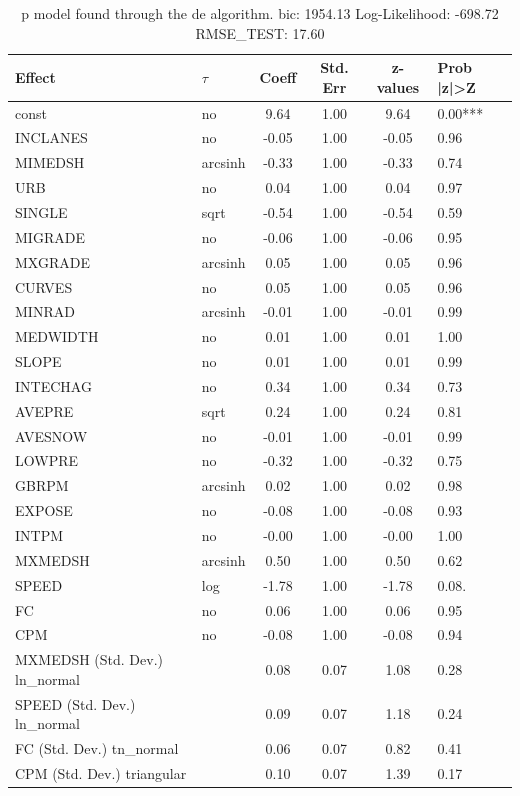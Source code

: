 \begin{table}
	\caption{p model found through the de algorithm. bic: 1954.13 Log-Likelihood: -698.72 RMSE_TEST: 17.60}
	\begin{center}
		\begin{tabular}{|l|l|c|c|c|l|}
			\hline
			Effect & $\tau$ & Coeff & Std. Err & z-values & Prob |z|>Z \\
			\hline
			const & no & 9.64 & 1.00 & 9.64 & 0.00*** \\
			\hline
			INCLANES & no & -0.05 & 1.00 & -0.05 & 0.96 \\
			\hline
			MIMEDSH & arcsinh & -0.33 & 1.00 & -0.33 & 0.74 \\
			\hline
			URB & no & 0.04 & 1.00 & 0.04 & 0.97 \\
			\hline
			SINGLE & sqrt & -0.54 & 1.00 & -0.54 & 0.59 \\
			\hline
			MIGRADE & no & -0.06 & 1.00 & -0.06 & 0.95 \\
			\hline
			MXGRADE & arcsinh & 0.05 & 1.00 & 0.05 & 0.96 \\
			\hline
			CURVES & no & 0.05 & 1.00 & 0.05 & 0.96 \\
			\hline
			MINRAD & arcsinh & -0.01 & 1.00 & -0.01 & 0.99 \\
			\hline
			MEDWIDTH & no & 0.01 & 1.00 & 0.01 & 1.00 \\
			\hline
			SLOPE & no & 0.01 & 1.00 & 0.01 & 0.99 \\
			\hline
			INTECHAG & no & 0.34 & 1.00 & 0.34 & 0.73 \\
			\hline
			AVEPRE & sqrt & 0.24 & 1.00 & 0.24 & 0.81 \\
			\hline
			AVESNOW & no & -0.01 & 1.00 & -0.01 & 0.99 \\
			\hline
			LOWPRE & no & -0.32 & 1.00 & -0.32 & 0.75 \\
			\hline
			GBRPM & arcsinh & 0.02 & 1.00 & 0.02 & 0.98 \\
			\hline
			EXPOSE & no & -0.08 & 1.00 & -0.08 & 0.93 \\
			\hline
			INTPM & no & -0.00 & 1.00 & -0.00 & 1.00 \\
			\hline
			MXMEDSH & arcsinh & 0.50 & 1.00 & 0.50 & 0.62 \\
			\hline
			SPEED & log & -1.78 & 1.00 & -1.78 & 0.08. \\
			\hline
			FC & no & 0.06 & 1.00 & 0.06 & 0.95 \\
			\hline
			CPM & no & -0.08 & 1.00 & -0.08 & 0.94 \\
			\hline
			MXMEDSH (Std. Dev.) ln_normal &  & 0.08 & 0.07 & 1.08 & 0.28 \\
			\hline
			SPEED (Std. Dev.) ln_normal &  & 0.09 & 0.07 & 1.18 & 0.24 \\
			\hline
			FC (Std. Dev.) tn_normal &  & 0.06 & 0.07 & 0.82 & 0.41 \\
			\hline
			CPM (Std. Dev.) triangular &  & 0.10 & 0.07 & 1.39 & 0.17 \\
			\hline
		\end{tabular}
	\end{center}
\end{table}